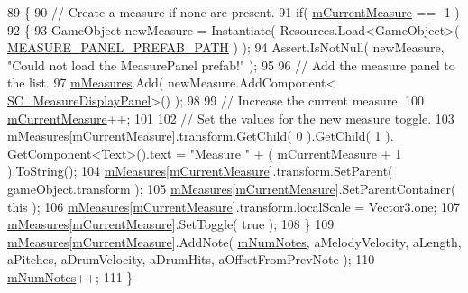 \begin{DoxyCode}
89     \{
90         \textcolor{comment}{// Create a measure if none are present.}
91         \textcolor{keywordflow}{if}( \hyperlink{group___s_c___n_d_c_priv_var_ga28ce2bf8358c9f686b5b9e362aa96dff}{mCurrentMeasure} == -1 )
92         \{
93             GameObject newMeasure = Instantiate( Resources.Load<GameObject>( 
      \hyperlink{group___s_c___n_d_c_const_gabc95cd739b62996e8a19f0e9417e5f8e}{MEASURE\_PANEL\_PREFAB\_PATH} ) );
94             Assert.IsNotNull( newMeasure, \textcolor{stringliteral}{"Could not load the MeasurePanel prefab!"} );
95 
96             \textcolor{comment}{// Add the measure panel to the list.}
97             \hyperlink{group___s_c___n_d_c_priv_var_gaa072fb53f6bd6646bc85f2ebc2a02229}{mMeasures}.Add( newMeasure.AddComponent<
      \hyperlink{class_s_c___measure_display_panel}{SC\_MeasureDisplayPanel}>() );
98 
99             \textcolor{comment}{// Increase the current measure.}
100             \hyperlink{group___s_c___n_d_c_priv_var_ga28ce2bf8358c9f686b5b9e362aa96dff}{mCurrentMeasure}++;
101 
102             \textcolor{comment}{// Set the values for the new measure toggle.}
103             \hyperlink{group___s_c___n_d_c_priv_var_gaa072fb53f6bd6646bc85f2ebc2a02229}{mMeasures}[\hyperlink{group___s_c___n_d_c_priv_var_ga28ce2bf8358c9f686b5b9e362aa96dff}{mCurrentMeasure}].transform.GetChild( 0 ).GetChild( 1 ).
      GetComponent<Text>().text = \textcolor{stringliteral}{"Measure "} + ( \hyperlink{group___s_c___n_d_c_priv_var_ga28ce2bf8358c9f686b5b9e362aa96dff}{mCurrentMeasure} + 1 ).ToString();
104             \hyperlink{group___s_c___n_d_c_priv_var_gaa072fb53f6bd6646bc85f2ebc2a02229}{mMeasures}[\hyperlink{group___s_c___n_d_c_priv_var_ga28ce2bf8358c9f686b5b9e362aa96dff}{mCurrentMeasure}].transform.SetParent( gameObject.transform );
105             \hyperlink{group___s_c___n_d_c_priv_var_gaa072fb53f6bd6646bc85f2ebc2a02229}{mMeasures}[\hyperlink{group___s_c___n_d_c_priv_var_ga28ce2bf8358c9f686b5b9e362aa96dff}{mCurrentMeasure}].SetParentContainer( \textcolor{keyword}{this} );
106             \hyperlink{group___s_c___n_d_c_priv_var_gaa072fb53f6bd6646bc85f2ebc2a02229}{mMeasures}[\hyperlink{group___s_c___n_d_c_priv_var_ga28ce2bf8358c9f686b5b9e362aa96dff}{mCurrentMeasure}].transform.localScale = Vector3.one;
107             \hyperlink{group___s_c___n_d_c_priv_var_gaa072fb53f6bd6646bc85f2ebc2a02229}{mMeasures}[\hyperlink{group___s_c___n_d_c_priv_var_ga28ce2bf8358c9f686b5b9e362aa96dff}{mCurrentMeasure}].SetToggle( \textcolor{keyword}{true} );
108         \}
109         \hyperlink{group___s_c___n_d_c_priv_var_gaa072fb53f6bd6646bc85f2ebc2a02229}{mMeasures}[\hyperlink{group___s_c___n_d_c_priv_var_ga28ce2bf8358c9f686b5b9e362aa96dff}{mCurrentMeasure}].AddNote( \hyperlink{group___s_c___n_d_c_priv_var_gae06a4919a63806ed57b2040f41b7ca1b}{mNumNotes}, aMelodyVelocity, 
      aLength, aPitches, aDrumVelocity, aDrumHits, aOffsetFromPrevNote );
110         \hyperlink{group___s_c___n_d_c_priv_var_gae06a4919a63806ed57b2040f41b7ca1b}{mNumNotes}++;
111     \}
\end{DoxyCode}
